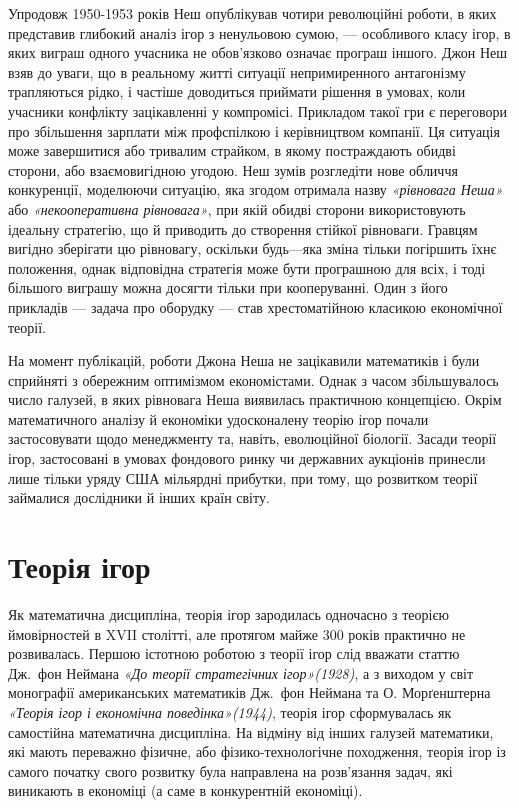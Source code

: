 \documentclass[a4paper]{article}
\begin{document}
Упродовж 1950-1953 років Неш опублікував чотири революційні роботи, в яких представив глибокий аналіз ігор з ненульовою сумою, — особливого класу ігор, в яких виграш одного учасника не обов'язково означає програш іншого. Джон Неш взяв до уваги, що в реальному житті ситуації непримиренного антагонізму трапляються рідко, і частіше доводиться приймати рішення в умовах, коли учасники конфлікту зацікавленні у компромісі. Прикладом такої гри є переговори про збільшення зарплати між профспілкою і керівництвом компанії. Ця ситуація може завершитися або тривалим страйком, в якому постраждають обидві сторони, або взаємовигідною угодою. Неш зумів розгледіти нове обличчя конкуренції, моделюючи ситуацію, яка згодом отримала назву \textit{«рівновага Неша»} або \textit{«некооперативна рівновага»}, при якій обидві сторони використовують ідеальну стратегію, що й приводить до створення стійкої рівноваги. Гравцям вигідно зберігати цю рівновагу, оскільки будь—яка зміна тільки погіршить їхнє положення, однак відповідна стратегія може бути програшною для всіх, і тоді більшого виграшу можна досягти тільки при кооперуванні. Один з його прикладів — задача про оборудку — став хрестоматійною класикою економічної теорії.

На момент публікацій, роботи Джона Неша не зацікавили математиків і були сприйняті з обережним оптимізмом економістами. Однак з часом збільшувалось число галузей, в яких рівновага Неша виявилась практичною концепцією. Окрім математичного аналізу й економіки удосконалену теорію ігор почали застосовувати щодо менеджменту та, навіть, еволюційної біології. Засади теорії ігор, застосовані в умовах фондового ринку чи державних аукціонів принесли лише тільки уряду США мільярдні прибутки, при тому, що розвитком теорії займалися дослідники й інших країн світу.

\section{Теорія ігор}
Як математична дисципліна, теорія ігор зародилась одночасно з теорією ймовірностей в XVII столітті, але протягом майже 300 років практично не розвивалась. Першою істотною роботою з теорії ігор слід вважати статтю Дж.~фон Неймана \textit{«До теорії стратегічних ігор»(1928)}, а з виходом у світ монографії американських математиків Дж.~фон Неймана та О. Морґенштерна \textit{«Теорія ігор і економічна поведінка»(1944)}\cite{Neyman}, теорія ігор сформувалась як самостійна математична дисципліна. На відміну від інших галузей математики, які мають переважно фізичне, або фізико-технологічне походження, теорія ігор із самого початку свого розвитку була направлена на розв'язання задач, які виникають в економіці (а саме в конкурентній економіці).
\end{document}
